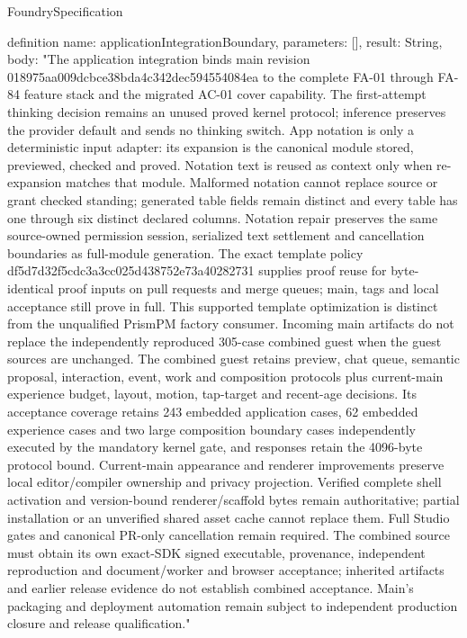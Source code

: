 \begin{lexlean}{FoundrySpecification}
\begin{semanticmodule}
definition{
  name: applicationIntegrationBoundary,
  parameters: [],
  result: String,
  body: "The application integration binds main revision 018975aa009dcbce38bda4c342dec594554084ea to the complete FA-01 through FA-84 feature stack and the migrated AC-01 cover capability. The first-attempt thinking decision remains an unused proved kernel protocol; inference preserves the provider default and sends no thinking switch. App notation is only a deterministic input adapter: its expansion is the canonical module stored, previewed, checked and proved. Notation text is reused as context only when re-expansion matches that module. Malformed notation cannot replace source or grant checked standing; generated table fields remain distinct and every table has one through six distinct declared columns. Notation repair preserves the same source-owned permission session, serialized text settlement and cancellation boundaries as full-module generation. The exact template policy df5d7d32f5cdc3a3cc025d438752e73a40282731 supplies proof reuse for byte-identical proof inputs on pull requests and merge queues; main, tags and local acceptance still prove in full. This supported template optimization is distinct from the unqualified PrismPM factory consumer. Incoming main artifacts do not replace the independently reproduced 305-case combined guest when the guest sources are unchanged. The combined guest retains preview, chat queue, semantic proposal, interaction, event, work and composition protocols plus current-main experience budget, layout, motion, tap-target and recent-age decisions. Its acceptance coverage retains 243 embedded application cases, 62 embedded experience cases and two large composition boundary cases independently executed by the mandatory kernel gate, and responses retain the 4096-byte protocol bound. Current-main appearance and renderer improvements preserve local editor/compiler ownership and privacy projection. Verified complete shell activation and version-bound renderer/scaffold bytes remain authoritative; partial installation or an unverified shared asset cache cannot replace them. Full Studio gates and canonical PR-only cancellation remain required. The combined source must obtain its own exact-SDK signed executable, provenance, independent reproduction and document/worker and browser acceptance; inherited artifacts and earlier release evidence do not establish combined acceptance. Main's packaging and deployment automation remain subject to independent production closure and release qualification."
}


\end{semanticmodule}
\end{lexlean}
